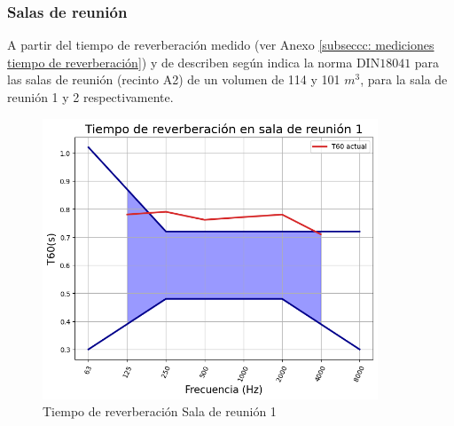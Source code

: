 \subsubsection{Salas de reunión}
A partir del tiempo de reverberación medido (ver Anexo \ref{subseccc: mediciones tiempo de reverberación})
y de describen según indica la norma DIN$18041$ para las salas de reunión (recinto A2) de un volumen de 114 y 101 $m^3$, para la sala de reunión 1 y 2 respectivamente.
    \begin{figure}[H]
        \centering
        \includegraphics[width=10cm]{Imagenes/DIN/DIN sala reunion 1 actual.png}
        \caption{Tiempo de reverberación Sala de reunión 1}
        \label{fig:Ttarget sala de reunion 1}
    \end{figure}

